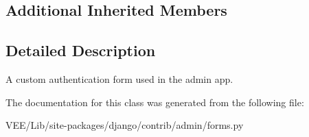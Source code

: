 \subsection*{Additional Inherited Members}


\subsection{Detailed Description}
\begin{DoxyVerb}A custom authentication form used in the admin app.
\end{DoxyVerb}
 

The documentation for this class was generated from the following file\+:\begin{DoxyCompactItemize}
\item 
V\+E\+E/\+Lib/site-\/packages/django/contrib/admin/forms.\+py\end{DoxyCompactItemize}
